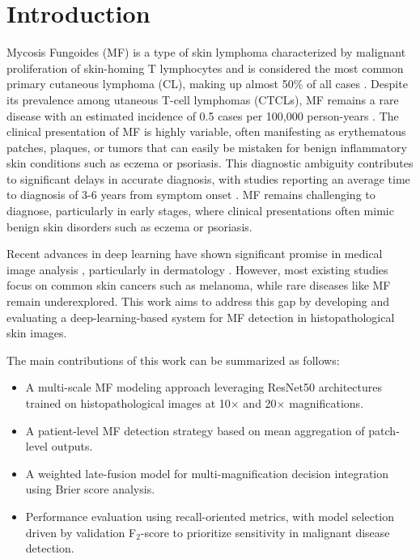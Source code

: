 \documentclass[conference]{IEEEtran}
\begin{document}
\section{Introduction}
Mycosis Fungoides (MF) is a type of skin lymphoma characterized by malignant proliferation of skin-homing T 
lymphocytes and is considered the most common primary cutaneous lymphoma (CL), making up almost 50\% of all cases \cite{willemze2005}. Despite its prevalence among utaneous 
T-cell lymphomas (CTCLs), MF remains a rare disease with an estimated incidence of 0.5 cases per 100,000 person-years \cite{willemze2005}. 
The clinical presentation of MF is highly variable, often manifesting as erythematous patches, plaques, or tumors that can easily be mistaken for 
benign inflammatory skin conditions such as eczema or psoriasis. This diagnostic ambiguity contributes to significant delays in accurate diagnosis, 
with studies reporting an average time to diagnosis of 3-6 years from symptom onset \cite{beatty2025_early_mf_diagnosis}.
MF remains challenging to diagnose, particularly in early stages, where clinical presentations often mimic benign skin disorders such as eczema or psoriasis.

Recent advances in deep learning have shown significant promise in medical image 
analysis \cite{litjens2017deep}, particularly in dermatology \cite{esteva2017dermatologist}. 
However, most existing studies 
focus on common skin cancers such as melanoma, while rare diseases like MF remain underexplored. This work aims to address this gap by developing and evaluating a 
deep-learning-based system for MF detection in histopathological skin images.

The main contributions of this work can be summarized as follows:
\begin{itemize}
    \item A multi-scale MF modeling approach leveraging ResNet50 architectures trained on histopathological images at 10$\times$ and 20$\times$ magnifications.
    \item A patient-level MF detection strategy based on mean aggregation of patch-level outputs.
    \item A weighted late-fusion model for multi-magnification decision integration using Brier score analysis.
    \item Performance evaluation using recall-oriented metrics, with model selection driven by validation F$_2$-score to prioritize sensitivity in malignant disease detection.
\end{itemize}
\end{document}
